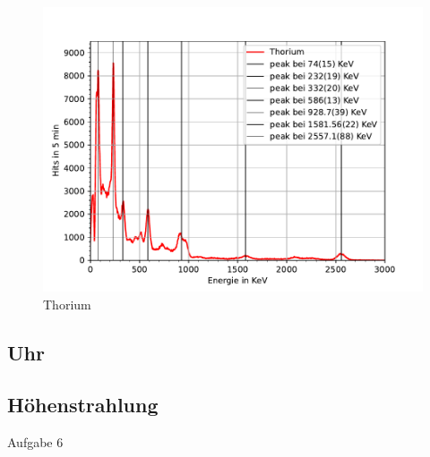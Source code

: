 \documentclass[11pt, a4paper]{article}
\begin{document}
    \begin{figure}[!h]
        \centering
        \includegraphics[width=\textwidth]{Plots/Thorium.pdf}
        \caption{Thorium}
        \label{fig:thor}
    \end{figure}

    

    
    \subsection{Uhr}

    \subsection{Höhenstrahlung}

    Aufgabe 6
\end{document}
